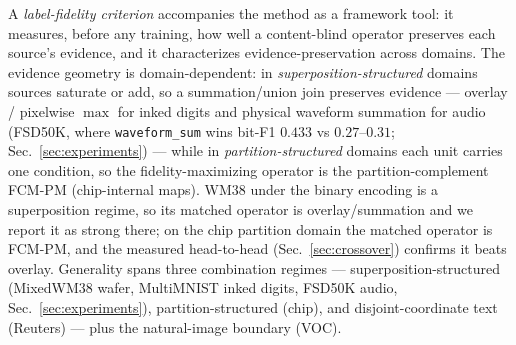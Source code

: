 \documentclass[11pt]{article}
\begin{document}
A \emph{label-fidelity criterion} accompanies the method as a framework tool: it
measures, before any training, how well a content-blind operator preserves each
source's evidence, and it characterizes evidence-preservation across domains. The
evidence geometry is domain-dependent: in \emph{superposition-structured} domains
sources saturate or add, so a summation/union join preserves evidence --- overlay /
pixelwise $\max$ for inked digits and physical waveform summation for audio (FSD50K,
where \texttt{waveform\_sum} wins bit-F1 $0.433$ vs $0.27$--$0.31$;
Sec.~\ref{sec:experiments}) --- while in \emph{partition-structured} domains each unit
carries one condition, so the fidelity-maximizing operator is the partition-complement
FCM-PM (chip-internal maps). WM38 under the binary encoding is a superposition regime,
so its matched operator is overlay/summation and we report it as strong there; on the
chip partition domain the matched operator is FCM-PM, and the measured head-to-head
(Sec.~\ref{sec:crossover}) confirms it beats overlay. Generality spans three
combination regimes --- superposition-structured (MixedWM38 wafer, MultiMNIST inked
digits, FSD50K audio, Sec.~\ref{sec:experiments}), partition-structured (chip), and
disjoint-coordinate text (Reuters) --- plus the natural-image boundary (VOC).
\end{document}
